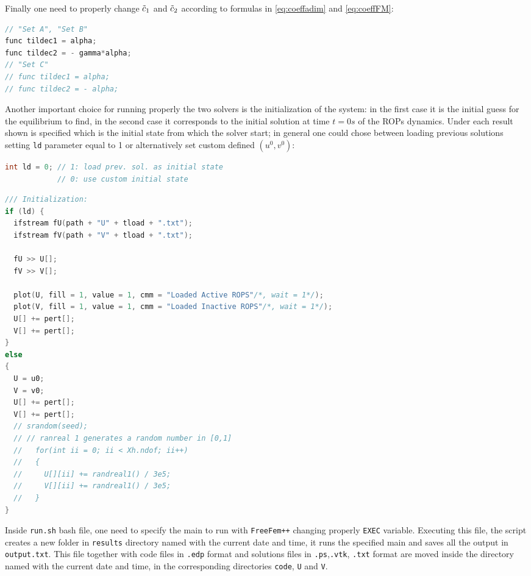 Finally one need to properly change $\Tilde{c}_1$ and $\Tilde{c}_2$ according to formulas in \eqref{eq:coeffadim} and \eqref{eq:coeffFM}:
\begin{lstlisting}[firstnumber = 16, language = C++, caption = PRM.edp: setting of $\Tilde{c}_1$ and $\Tilde{c}_2$]
// "Set A", "Set B"
func tildec1 = alpha;
func tildec2 = - gamma*alpha;
// "Set C"
// func tildec1 = alpha;
// func tildec2 = - alpha;
\end{lstlisting}

Another important choice for running properly the two solvers is the initialization of the system: in the first case it is the initial guess for the equilibrium to find, in the second case it corresponds to the initial solution at time $t = 0s$ of the ROPs dynamics. Under each result shown is specified which is the initial state from which the solver start; in general one could chose between loading previous solutions setting \verb|ld| parameter equal to 1 or alternatively set custom defined $(u^0, v^0)$:
\begin{lstlisting}[firstnumber = 8, language = C++, caption = choice for initialization]
int ld = 0; // 1: load prev. sol. as initial state
            // 0: use custom initial state
\end{lstlisting}
\begin{lstlisting}[language = C++]
/// Initialization:
if (ld) {
  ifstream fU(path + "U" + tload + ".txt");
  ifstream fV(path + "V" + tload + ".txt");

  fU >> U[];
  fV >> V[];

  plot(U, fill = 1, value = 1, cmm = "Loaded Active ROPS"/*, wait = 1*/);
  plot(V, fill = 1, value = 1, cmm = "Loaded Inactive ROPS"/*, wait = 1*/);
  U[] += pert[];
  V[] += pert[];
}
else
{
  U = u0;
  V = v0;
  U[] += pert[];
  V[] += pert[];
  // srandom(seed);
  // // ranreal 1 generates a random number in [0,1]
  //   for(int ii = 0; ii < Xh.ndof; ii++)
  //   {
  //     U[][ii] += randreal1() / 3e5;
  //     V[][ii] += randreal1() / 3e5;
  //   }
}
\end{lstlisting}

Inside \verb|run.sh| bash file, one need to specify the main to run with \verb|FreeFem++| changing properly \verb|EXEC| variable. Executing this file, the script creates a new folder in \verb|results| directory named with the current date and time, it runs the specified main and saves all the output in \verb|output.txt|. This file together with code files in \verb|.edp| format and solutions files in \verb|.ps|,\verb|.vtk|, \verb|.txt| format are moved inside the directory named with the current date and time, in the corresponding directories \verb|code|, \verb|U| and \verb|V|.


